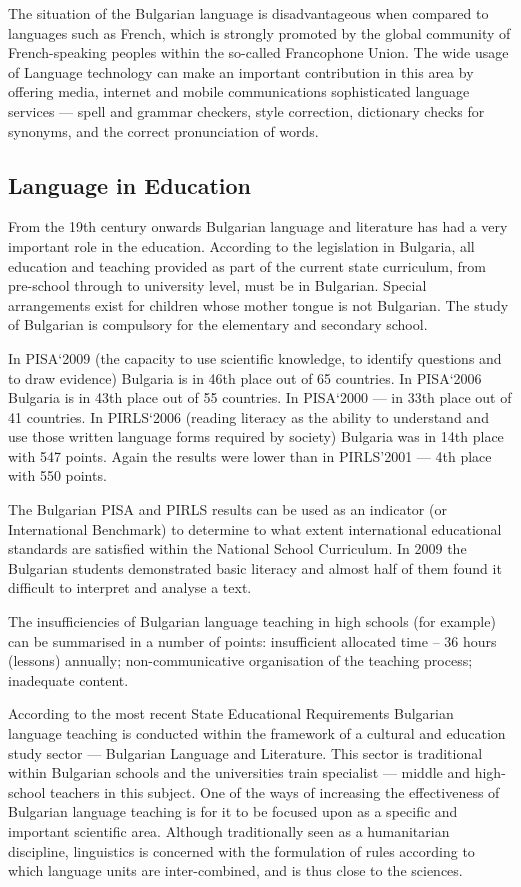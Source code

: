 \begin{multicols}{2}
The situation of the Bulgarian language is disadvantageous when compared to languages such as French, which is strongly promoted by the global community of French-speaking peoples within the so-called Francophone Union. The wide usage of Language technology can make an important contribution in this area by offering media, internet and mobile communications sophisticated language services — spell and grammar checkers, style correction, dictionary checks for synonyms, and the correct pronunciation of words.


\subsection{Language in Education}


From the 19th century onwards Bulgarian language and literature has had a very important role in the education. According to the legislation in Bulgaria, all education and teaching provided as part of the current state curriculum, from pre-school through to university level, must be in Bulgarian. Special arrangements exist for children whose mother tongue is not Bulgarian. The study of Bulgarian is compulsory for the elementary and secondary school.

In PISA‘2009 \cite{oecd} (the capacity to use scientific knowledge, to identify questions and to draw evidence) Bulgaria is in 46th place out of 65 countries. In PISA‘2006 Bulgaria is in 43th place out of 55 countries. In PISA‘2000 — in 33th place out of 41 countries. 
In PIRLS‘2006 \cite{nces} (reading literacy as the ability to understand and use those written language forms required by society) Bulgaria was in 14th place with 547 points. Again the results were lower than in PIRLS’2001 — 4th place with 550 points.

The Bulgarian PISA and PIRLS results can be used as an indicator (or International Benchmark) to determine to what extent international educational standards are satisfied within the National School Curriculum. In 2009 the Bulgarian students demonstrated basic literacy and almost half of them found it difficult to interpret and analyse a text. 

The insufficiencies of Bulgarian language teaching in high schools (for example) can be summarised in a number of points: insufficient allocated time – 36 hours (lessons) annually; non-communicative organisation of the teaching process; inadequate content.

According to the most recent State Educational Requirements Bulgarian language teaching is conducted within the framework of a cultural and education study sector — Bulgarian Language and Literature. This sector is traditional within Bulgarian schools and the universities train specialist — middle and high-school teachers in this subject. One of the ways of increasing the effectiveness of Bulgarian language teaching is for it to be focused upon as a specific and important scientific area. Although traditionally seen as a humanitarian discipline, linguistics is concerned with the formulation of rules according to which language units are inter-combined, and is thus close to the sciences. 


\end{multicols}

